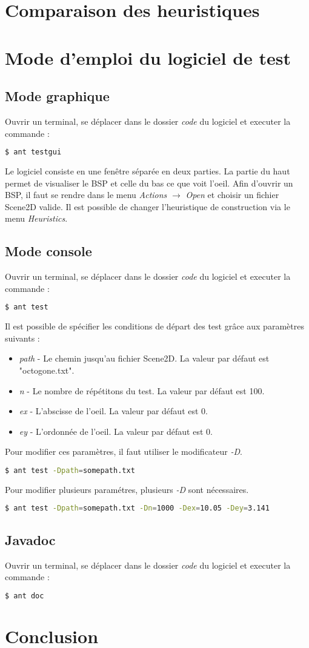 \documentclass[11pts]{article}
\begin{document}
\newpage
\section{Comparaison des heuristiques}


\newpage
\section{Mode d'emploi du logiciel de test}
\subsection*{Mode graphique}
Ouvrir un terminal, se déplacer dans le dossier \emph{code} du logiciel et executer la commande :
\begin{lstlisting}[language=bash]
$ ant testgui
\end{lstlisting}
Le logiciel consiste en une fenêtre séparée en deux parties. La partie du haut permet de visualiser le BSP et celle du bas ce que voit l'oeil.
Afin d'ouvrir un BSP, il faut se rendre dans le menu \emph{Actions} $\rightarrow$ \emph{Open} et choisir un fichier Scene2D valide.
Il est possible de changer l'heuristique de construction via le menu \emph{Heuristics}.
\subsection*{Mode console}
Ouvrir un terminal, se déplacer dans le dossier \emph{code} du logiciel et executer la commande :
\begin{lstlisting}[language=bash]
$ ant test
\end{lstlisting}
Il est possible de spécifier les conditions de départ des test grâce aux paramètres suivants :
\begin{itemize}%
\item \emph{path} - Le chemin jusqu'au fichier Scene2D. La valeur par défaut est "octogone.txt".
\item \emph{n} - Le nombre de répétitons du test. La valeur par défaut est 100.
\item \emph{ex} - L'abscisse de l'oeil. La valeur par défaut est 0.
\item \emph{ey} - L'ordonnée de l'oeil. La valeur par défaut est 0.
\end{itemize}
Pour modifier ces paramètres, il faut utiliser le modificateur \emph{-D}.
\begin{lstlisting}[language=bash]
$ ant test -Dpath=somepath.txt
\end{lstlisting}
Pour modifier plusieurs paramétres, plusieurs \emph{-D} sont nécessaires.
\begin{lstlisting}[language=bash]
$ ant test -Dpath=somepath.txt -Dn=1000 -Dex=10.05 -Dey=3.141
\end{lstlisting}
\subsection*{Javadoc}
Ouvrir un terminal, se déplacer dans le dossier \emph{code} du logiciel et executer la commande :
\begin{lstlisting}[language=bash]
$ ant doc
\end{lstlisting}


\newpage
\section{Conclusion}
\end{document}
